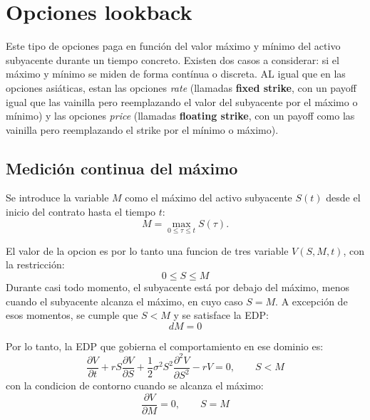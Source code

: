 \section{Opciones lookback}\label{sec:lookback_options}
Este tipo de opciones paga en función del valor máximo y mínimo del activo subyacente durante un tiempo concreto. Existen dos casos a considerar: si el máximo y mínimo se miden de forma contínua o discreta. AL igual que en las opciones asiáticas, estan las opciones \textit{rate} (llamadas \textbf{fixed strike}, con un payoff igual que las vainilla pero reemplazando el valor del subyacente por el máximo o mínimo) y las opciones \textit{price} (llamadas \textbf{floating strike}, con un payoff como las vainilla pero reemplazando el strike por el mínimo o máximo).



\subsection{Medición continua del máximo}
Se introduce la variable $M$ como el máximo del activo subyacente $S(t)$ desde el inicio del contrato hasta el tiempo $t$:
\begin{equation*}
    M = \max_{0 \leq \tau \leq t} S(\tau).
\end{equation*}

El valor de la opcion es por lo tanto una funcion de tres variable $V(S, M, t)$, con la restricción:
\begin{equation*}
    0 \leq S \leq M
\end{equation*}
Durante casi todo momento, el subyacente está por debajo del máximo, menos cuando el subyacente alcanza el máximo, en cuyo caso $S = M$. A excepción de esos momentos, se cumple que $S < M$ y se satisface la EDP:\@
\begin{equation*}
    dM = 0
\end{equation*}

Por lo tanto, la EDP que gobierna el comportamiento en ese dominio es:
\begin{equation*}
    \boxed{\frac{\partial V}{\partial t} + r S \frac{\partial V}{\partial S} + \frac{1}{2} \sigma^2 S^2 \frac{\partial^2 V}{\partial S^2} - r V = 0, \qquad S < M}
\end{equation*}
con la condicion de contorno cuando se alcanza el máximo:
\begin{equation*}
    \frac{\partial V}{\partial M} = 0, \qquad S = M
\end{equation*}

